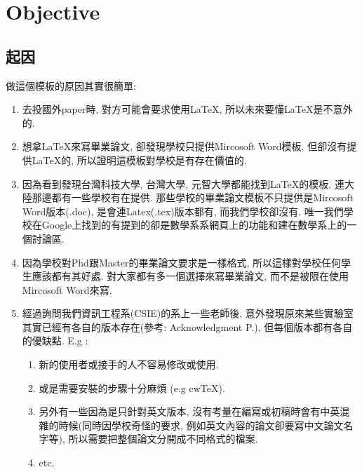 \chapter{Objective}
\label{chapter:objective}

\baselineskip=26pt

\section{起因}

做這個模板的原因其實很簡單:

\begin{enumerate}
    \item 去投國外paper時, 對方可能會要求使用LaTeX, 所以未來要懂LaTeX是不意外的.

    \item 想拿LaTeX來寫畢業論文, 卻發現學校只提供Mircosoft Word模板, 但卻沒有提供LaTeX的, 所以證明這模板對學校是有存在價值的.

    \item 因為看到發現台灣科技大學\cite{web:latex:template:ntust}, 台灣大學\cite{web:latex:template:ntu}, 元智大學\cite{web:latex:template:ntust}都能找到LaTeX的模板, 連大陸那邊都有一些學校有在提供. 那些學校的畢業論文模板不只提供是Mircosoft Word版本(.doc), 是會連Latex(.tex)版本都有, 而我們學校卻沒有. 唯一我們學校在Google上找到的有提到的卻是數學系系網頁上的功能\cite{web:latex:ncku_math_introduction}和建在數學系上的一個討論區\cite{web:latex:ncku_math_forum}.

    \item 因為學校對Phd跟Master的畢業論文要求是一樣格式, 所以這樣對學校任何學生應該都有其好處. 對大家都有多一個選擇來寫畢業論文, 而不是被限在使用Mircosoft Word來寫.

    \item 經過詢問我們資訊工程系(CSIE)的系上一些老師後, 意外發現原來某些實驗室其實已經有各自的版本存在(參考: Acknowledgment P.\pageref{acknowledgments-chi}), 但每個版本都有各自的優缺點. E.g :

        \begin{enumerate}

            \item 新的使用者或接手的人不容易修改或使用.

            \item 或是需要安裝的步驟十分麻煩 (e.g cwTeX\cite{web:latex:cwtex}).

            \item 另外有一些因為是只針對英文版本, 沒有考量在編寫或初稿時會有中英混雜的時候(同時因學校奇怪的要求, 例如英文內容的論文卻要寫中文論文名字等), 所以需要把整個論文分開成不同格式的檔案.

            \item etc.

        \end{enumerate}

\end{enumerate}

